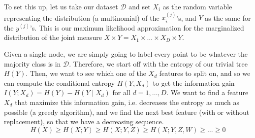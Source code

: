 \documentclass{article}
\theoremstyle{definition}
\theoremstyle{remark}
\theoremstyle{definition}
\begin{document}
To set this up, let us take our dataset $\mathcal{D}$ and set $X_i$ as the random variable representing the distribution (a multinomial) of the $x_i^{(j)}$'s, and $Y$ as the same for the $y^{(j)}$'s. This is our maximum likelihood approximation for the marginalized distribution of the joint measure $X \times Y = X_1 \times \ldots \times X_D \times Y$. 

Given a single node, we are simply going to label every point to be whatever the majority class is in $\mathcal{D}$. Therefore, we start off with the entropy of our trivial tree $H(Y)$. Then, we want to see which one of the $X_d$ features to split on, and so we can compute the conditional entropy $H(Y, X_d)$ to get the information gain $I(Y; X_d) = H(Y) - H(Y \mid X_d)$ for all $d = 1, \ldots, D$. We want to find a feature $X_d$ that maximize this information gain, i.e. decreases the entropy as much as possible (a greedy algorithm), and we find the next best feature (with or without replacement), so that we have a decreasing sequence. 
\[H(X) \geq H(X ; Y) \geq H(X ; Y, Z) \geq H(X ; Y, Z, W) \geq \ldots \geq 0\]
\end{document}
